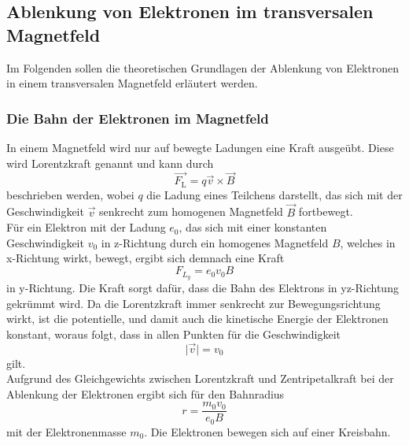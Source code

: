 \subsection{Ablenkung von Elektronen im transversalen Magnetfeld}
\label{sec:ablenkung_bfeld}

    Im Folgenden sollen die theoretischen Grundlagen der Ablenkung von Elektronen in einem transversalen Magnetfeld erläutert werden.

\subsubsection{Die Bahn der Elektronen im Magnetfeld}

    In einem Magnetfeld wird nur auf bewegte Ladungen eine Kraft ausgeübt.
    Diese wird Lorentzkraft genannt und kann durch 
    \begin{equation*}
        \vec{F_\text{L}} = q \vec{v} \times \vec{B}
    \end{equation*}
    beschrieben werden, 
    wobei $q$ die Ladung eines Teilchens darstellt,
    das sich mit der Geschwindigkeit $\vec{v}$ senkrecht zum homogenen Magnetfeld $\vec{B}$ fortbewegt.\\
    Für ein Elektron mit der Ladung $e_0$,
    das sich mit einer konstanten Geschwindigkeit $v_0$ in z-Richtung durch ein homogenes Magnetfeld $B$,
    welches in x-Richtung wirkt,
    bewegt,
    ergibt sich demnach eine Kraft
    \begin{equation*}
        F_{L_y} = e_0 v_0 B
    \end{equation*}
    in y-Richtung.
    Die Kraft sorgt dafür,
    dass die Bahn des Elektrons in yz-Richtung gekrümmt wird.
    Da die Lorentzkraft immer senkrecht zur Bewegungsrichtung wirkt,
    ist die potentielle,
    und damit auch die kinetische Energie der Elektronen konstant,
    woraus folgt,
    dass in allen Punkten für die Geschwindigkeit
    \begin{equation*}
        \lvert \vec{v} \rvert = v_0 
    \end{equation*}
    gilt.\\
    Aufgrund des Gleichgewichts zwischen Lorentzkraft und Zentripetalkraft bei der Ablenkung der Elektronen ergibt sich für den Bahnradius
    \begin{equation}
        r = \frac{m_0 v_0}{e_0 B}
        \label{eqn:bahnradius}
    \end{equation}
    mit der Elektronenmasse $m_0$.
    Die Elektronen bewegen sich auf einer Kreisbahn.\\
